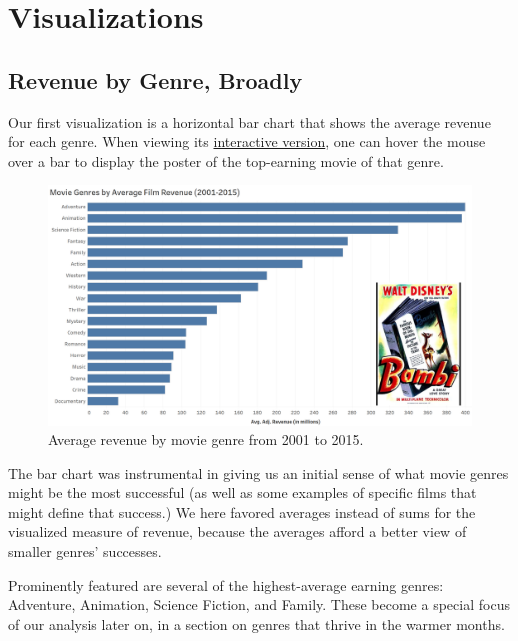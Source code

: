 \documentclass[12pt]{article}
\begin{document}
\section{Visualizations}

\subsection{ Revenue by Genre, Broadly}

Our first visualization is a horizontal bar chart that shows the average revenue for each genre. When viewing its \href{https://public.tableau.com/views/bar_chart_updated/BarChart?:language=en-US&publish=yes&:sid=&:display_count=n&:origin=viz_share_link}{interactive version}, one can hover the mouse over a bar to display the poster of the top-earning movie of that genre.

\begin{figure}[h!]
    \centering
    \includegraphics[width=1\textwidth]{images/final_drafts/genre_bar_chart_static.png}
    \caption{Average revenue by movie genre from 2001 to 2015.}
    \label{fig:figure_8}
\end{figure}

The bar chart was instrumental in giving us an initial sense of what movie genres might be the most successful (as well as some examples of specific films that might define that success.) We here favored averages instead of sums for the visualized measure of revenue, because the averages afford a better view of smaller genres' successes.

Prominently featured are several of the highest-average earning genres: Adventure, Animation, Science Fiction, and Family. These become a special focus of our analysis later on, in a section on genres that thrive in the warmer months. 
\end{document}

